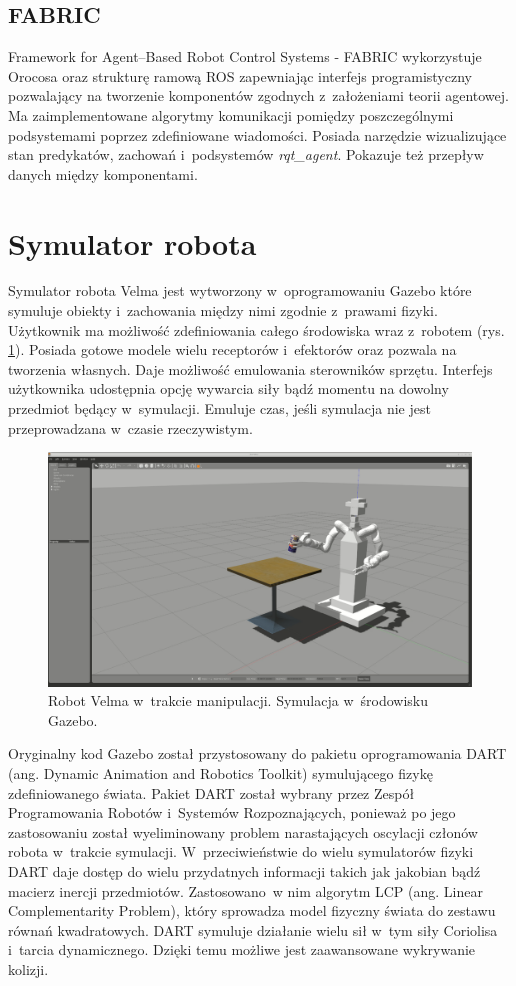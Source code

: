 	\subsection{FABRIC}
	Framework for Agent–Based Robot Control Systems - FABRIC\cite{bib:fabric} wykorzystuje Orocosa oraz strukturę ramową ROS zapewniając interfejs programistyczny pozwalający na tworzenie komponentów zgodnych z~założeniami teorii agentowej. Ma zaimplementowane algorytmy komunikacji pomiędzy poszczególnymi podsystemami poprzez zdefiniowane wiadomości. Posiada narzędzie wizualizujące stan predykatów, zachowań i~podsystemów \textit{rqt\_agent}\cite{bib:rqtAgent}. Pokazuje też przepływ danych między komponentami.

	
	\section{Symulator robota}
	Symulator robota Velma jest wytworzony w~oprogramowaniu Gazebo \cite{bib:Gazebo} które symuluje obiekty i~zachowania między nimi zgodnie z~prawami fizyki. Użytkownik ma możliwość zdefiniowania całego środowiska wraz z~robotem (rys. \ref{fig:gazebo}). Posiada gotowe modele wielu receptorów i~efektorów oraz pozwala na tworzenia własnych. Daje możliwość emulowania sterowników sprzętu. Interfejs użytkownika udostępnia opcję wywarcia siły bądź momentu na dowolny przedmiot będący w~symulacji. Emuluje czas, jeśli symulacja nie jest przeprowadzana w~czasie rzeczywistym.
	
	\begin{figure}
		\centering
		\includegraphics[width=.6\textwidth]{images/gazebo.png}
		\caption{Robot Velma w~trakcie manipulacji. Symulacja w~środowisku Gazebo.}
		\label{fig:gazebo}
	\end{figure}

	Oryginalny kod Gazebo został przystosowany do pakietu oprogramowania DART (ang. Dynamic Animation and Robotics Toolkit) \cite{bib:dart} symulującego fizykę zdefiniowanego świata. Pakiet DART został wybrany przez Zespół Programowania Robotów i~Systemów Rozpoznających, ponieważ po jego zastosowaniu został wyeliminowany problem narastających oscylacji członów robota w~trakcie symulacji. W~przeciwieństwie do wielu symulatorów fizyki DART daje dostęp do wielu przydatnych informacji takich jak jakobian bądź macierz inercji przedmiotów. Zastosowano~w nim algorytm LCP (ang. Linear Complementarity Problem), \cite{bib:lpcBase} który sprowadza model fizyczny świata do zestawu równań kwadratowych. DART symuluje działanie wielu sił w~tym siły Coriolisa i~tarcia dynamicznego. Dzięki temu możliwe jest zaawansowane wykrywanie kolizji. 
	
	